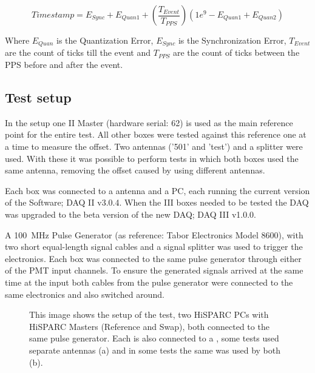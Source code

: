 \begin{equation}
    Timestamp = E_{Sync} + E_{Quan1} + \left(\frac{T_{Event}}{T_{PPS}}\right)
                 \left(1e^9 - E_{Quan1} + E_{Quan2}\right)
\end{equation}

Where $E_{Quan}$ is the Quantization Error, $E_{Sync}$ is the
Synchronization Error, $T_{Event}$ are the count of ticks till the event
and $T_{PPS}$ are the count of ticks between the PPS before and after
the event.


\subsection{Test setup}
\label{sub:gps_test_setup}

In the setup one \hisparc II Master (hardware serial: 62) is used as the
main reference point for the entire test. All other \hisparc boxes were
tested against this reference one at a time to measure the offset. Two
\gps antennas ('501' and 'test') and a \gps splitter were used. With
these it was possible to perform tests in which both \hisparc boxes used
the same \gps antenna, removing the offset caused by using different
\gps antennas.

Each \hisparc box was connected to a \gps antenna and a PC, each running
the current version of the \hisparc Software; \hisparc DAQ II v3.0.4.
When the \hisparc III boxes needed to be tested the DAQ was upgraded to
the beta version of the new DAQ; \hisparc DAQ III v1.0.0.

A \SI{100}{\mega\hertz} Pulse Generator (as reference: Tabor Electronics
Model 8600), with two short equal-length signal cables and a signal
splitter was used to trigger the \hisparc electronics. Each box was
connected to the same pulse generator through either of the PMT input
channels. To ensure the generated signals arrived at the same time at
the input both cables from the pulse generator were connected to the
same \hisparc electronics and also switched around.

\begin{figure}
    \centering
    
    \caption{This image shows the setup of the test, two HiSPARC PCs
             with HiSPARC Masters (Reference and Swap), both connected
             to the same pulse generator. Each is also connected to a
             \gps, some tests used separate \gps antennas (a) and in
             some tests the same \gps was used by both (b).}
    \label{fig:setup}
\end{figure}


